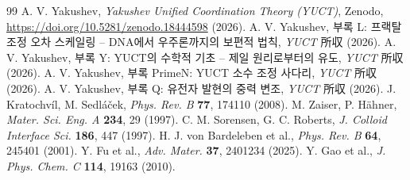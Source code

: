 \documentclass[11pt,a4paper]{article}
\begin{document}
	\begin{thebibliography}{99}
		A. V. Yakushev, \emph{Yakushev Unified Coordination Theory (YUCT)}, Zenodo, \url{https://doi.org/10.5281/zenodo.18444598} (2026).
		A. V. Yakushev, 부록 L: 프랙탈 조정 오차 스케일링 -- DNA에서 우주론까지의 보편적 법칙, \emph{YUCT} 所収 (2026).
		A. V. Yakushev, 부록 Y: YUCT의 수학적 기초 -- 제일 원리로부터의 유도, \emph{YUCT} 所収 (2026).
		A. V. Yakushev, 부록 PrimeN: YUCT 소수 조정 사다리, \emph{YUCT} 所収 (2026).
		A. V. Yakushev, 부록 Q: 유전자 발현의 중력 변조, \emph{YUCT} 所収 (2026).
		J. Kratochv\'il, M. Sedl\'a\v{c}ek, \emph{Phys. Rev. B} \textbf{77}, 174110 (2008).
		M. Zaiser, P. H\"ahner, \emph{Mater. Sci. Eng. A} \textbf{234}, 29 (1997).
		C. M. Sorensen, G. C. Roberts, \emph{J. Colloid Interface Sci.} \textbf{186}, 447 (1997).
		H. J. von Bardeleben et al., \emph{Phys. Rev. B} \textbf{64}, 245401 (2001).
		Y. Fu et al., \emph{Adv. Mater.} \textbf{37}, 2401234 (2025).
		Y. Gao et al., \emph{J. Phys. Chem. C} \textbf{114}, 19163 (2010).
	\end{thebibliography}
	
\end{document}
